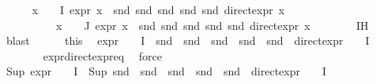 \begin{isabellebody}
\ \ \ \ \isamarkupfalse%
\ {\isachardoublequoteopen}{\isasymforall}x\ {\isasymin}\ {\isasymPhi}\ {\isacharbackquote}{\kern0pt}\ I{\isachardot}{\kern0pt}\ expr{\isacharunderscore}{\kern0pt}{}\ x\ {\isacharequal}{\kern0pt}\ snd\ {\isacharparenleft}{\kern0pt}snd\ {\isacharparenleft}{\kern0pt}snd\ {\isacharparenleft}{\kern0pt}snd\ {\isacharparenleft}{\kern0pt}snd\ {\isacharparenleft}{\kern0pt}direct{\isacharunderscore}{\kern0pt}expr\ x{\isacharparenright}{\kern0pt}{\isacharparenright}{\kern0pt}{\isacharparenright}{\kern0pt}{\isacharparenright}{\kern0pt}{\isacharparenright}{\kern0pt}{\isachardoublequoteclose}\isanewline
\ \ \ \ \ \ \ \ \ \ {\isachardoublequoteopen}{\isasymforall}x\ {\isasymin}\ {\isasymPhi}\ {\isacharbackquote}{\kern0pt}\ J{\isachardot}{\kern0pt}\ expr{\isacharunderscore}{\kern0pt}{}\ x\ {\isacharequal}{\kern0pt}\ snd\ {\isacharparenleft}{\kern0pt}snd\ {\isacharparenleft}{\kern0pt}snd\ {\isacharparenleft}{\kern0pt}snd\ {\isacharparenleft}{\kern0pt}snd\ {\isacharparenleft}{\kern0pt}direct{\isacharunderscore}{\kern0pt}expr\ x{\isacharparenright}{\kern0pt}{\isacharparenright}{\kern0pt}{\isacharparenright}{\kern0pt}{\isacharparenright}{\kern0pt}{\isacharparenright}{\kern0pt}{\isachardoublequoteclose}\isanewline
\ \ \ \ \ \ \isamarkupfalse%
\ IH\ \isamarkupfalse%
\ blast{\isacharplus}{\kern0pt}\isanewline
\ \ \ \ \isamarkupfalse%
\ this{\isacharparenleft}{\kern0pt}{}{\isacharparenright}{\kern0pt}\ \isamarkupfalse%
\ {\isachardoublequoteopen}{\isacharparenleft}{\kern0pt}{\isacharparenleft}{\kern0pt}expr{\isacharunderscore}{\kern0pt}{}\ {\isasymcirc}\ {\isasymPhi}{\isacharparenright}{\kern0pt}\ {\isacharbackquote}{\kern0pt}\ I{\isacharparenright}{\kern0pt}\ {\isacharequal}{\kern0pt}\ {\isacharparenleft}{\kern0pt}{\isacharparenleft}{\kern0pt}snd\ {\isasymcirc}\ snd\ {\isasymcirc}\ snd\ {\isasymcirc}\ snd\ {\isasymcirc}\ snd\ {\isasymcirc}\ direct{\isacharunderscore}{\kern0pt}expr\ {\isasymcirc}\ {\isasymPhi}{\isacharparenright}{\kern0pt}\ {\isacharbackquote}{\kern0pt}\ I{\isacharparenright}{\kern0pt}{\isachardoublequoteclose}\isanewline
\ \ \ \ \ \ \isamarkupfalse%
\ expr{\isacharunderscore}{\kern0pt}{}{\isacharunderscore}{\kern0pt}direct{\isacharunderscore}{\kern0pt}expr{\isacharunderscore}{\kern0pt}eq\ \isamarkupfalse%
\ force\isanewline
\ \ \ \ \isamarkupfalse%
\ {\isachardoublequoteopen}Sup\ {\isacharparenleft}{\kern0pt}{\isacharparenleft}{\kern0pt}expr{\isacharunderscore}{\kern0pt}{}\ {\isasymcirc}\ {\isasymPhi}{\isacharparenright}{\kern0pt}\ {\isacharbackquote}{\kern0pt}\ I{\isacharparenright}{\kern0pt}\ {\isacharequal}{\kern0pt}\ Sup\ {\isacharparenleft}{\kern0pt}{\isacharparenleft}{\kern0pt}snd\ {\isasymcirc}\ snd\ {\isasymcirc}\ snd\ {\isasymcirc}\ snd\ {\isasymcirc}\ snd\ {\isasymcirc}\ direct{\isacharunderscore}{\kern0pt}expr\ {\isasymcirc}\ {\isasymPhi}{\isacharparenright}{\kern0pt}\ {\isacharbackquote}{\kern0pt}\ I{\isacharparenright}{\kern0pt}{\isachardoublequoteclose}\isanewline

\end{isabellebody}
